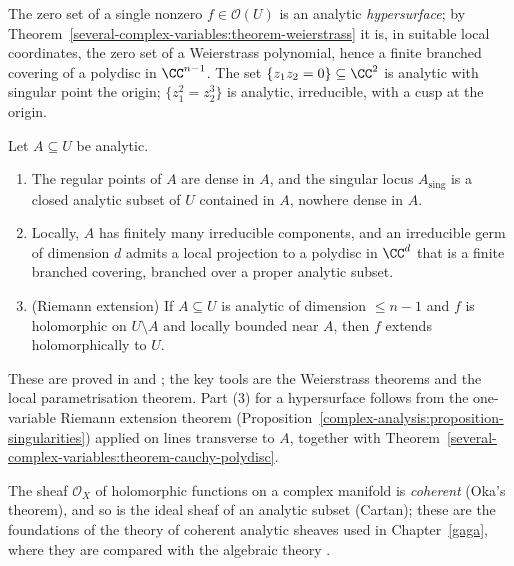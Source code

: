 \begin{example}\label{several-complex-variables:example-analytic-sets}
The zero set of a single nonzero $f \in \mathcal{O}(U)$ is an analytic \emph{hypersurface}; by Theorem~\ref{several-complex-variables:theorem-weierstrass} it is, in suitable local coordinates, the zero set
of a Weierstrass polynomial, hence a finite branched covering of a polydisc in $\CC^{n-1}$. The set $\{z_1z_2 = 0\} \subseteq \CC^2$ is analytic with singular point the origin; $\{z_1^2 = z_2^3\}$ is analytic,
irreducible, with a cusp at the origin.
\end{example}

\begin{theorem}\label{several-complex-variables:theorem-analytic-structure}
Let $A \subseteq U$ be analytic.
\begin{enumerate}
\item The regular points of $A$ are dense in $A$, and the singular locus $A_{\mathrm{sing}}$ is a closed analytic subset of $U$ contained in $A$, nowhere dense in $A$.
\item Locally, $A$ has finitely many irreducible components, and an irreducible germ of dimension $d$ admits a local projection to a polydisc in $\CC^d$ that is a finite branched covering, branched over a
proper analytic subset.
\item (Riemann extension) If $A \subseteq U$ is analytic of dimension $\leq n - 1$ and $f$ is holomorphic on $U \setminus A$ and locally bounded near $A$, then $f$ extends holomorphically to $U$.
\end{enumerate}
\end{theorem}

These are proved in \cite[Chapters II--III]{gunning-rossi} and \cite[Chapters 1--6]{grauert-remmert}; the key tools are the Weierstrass theorems and the local parametrisation theorem. Part (3) for a
hypersurface follows from the one-variable Riemann extension theorem (Proposition~\ref{complex-analysis:proposition-singularities}) applied on lines transverse to $A$, together with
Theorem~\ref{several-complex-variables:theorem-cauchy-polydisc}.

\begin{remark}\label{several-complex-variables:remark-coherence}
The sheaf $\mathcal{O}_X$ of holomorphic functions on a complex manifold is \emph{coherent} (Oka's theorem), and so is the ideal sheaf of an analytic subset (Cartan); these are the foundations of the theory
of coherent analytic sheaves used in Chapter~\ref{gaga}, where they are compared with the algebraic theory \cite{grauert-remmert}.
\end{remark}

